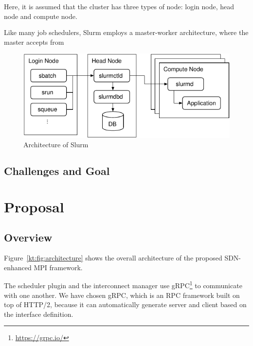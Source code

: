 \documentclass[graybox]{svmult}
\begin{document}
Here, it is assumed
that the cluster has three types of node: login node, head node and compute
node.

Like many job
schedulers, Slurm employs a master-worker architecture, where the master
accepts from

\begin{figure}
    \centering
    \includegraphics{slurm}
    \caption{Architecture of Slurm}%
    \label{kt:fig:slurm}
\end{figure}

\subsection{Challenges and Goal}

\section{Proposal}

\subsection{Overview}

Figure~\ref{kt:fig:architecture} shows the overall architecture of the
proposed SDN-enhanced MPI framework.

The scheduler plugin and the interconnect manager use
gRPC\footnote{\url{https://grpc.io/}} to communicate with one another. We have
chosen gRPC, which is an RPC framework built on top of HTTP/2, because it
can automatically generate server and client based on the interface
definition.
\end{document}
